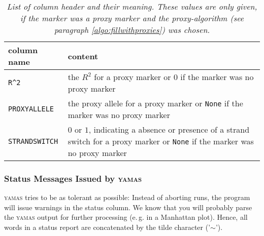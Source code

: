 \begin{table}[H]
 \caption{\emph{List of column header and their meaning. These values are only given, if the marker was a proxy marker and the proxy-algorithm (see paragraph \ref{algo:fillwithproxies}) was chosen.}}
 \centering
 \label{usage:table:proxymarker_entries}
\begin{tabular}{p{3cm}p{12cm}}
\rowcolor{light-gray}column name & content\\\hline
\verb+R^2+     & the $R^2$ for a proxy marker or $0$ if the marker was no proxy marker\\
\verb+PROXYALLELE+ & the proxy allele for a  proxy marker or \verb+None+ if the marker was no proxy marker\\
\verb+STRANDSWITCH+ & $0$ or $1$, indicating a absence or presence of a strand switch for a proxy marker or \verb+None+ if the marker was no proxy marker\\

\end{tabular}
\end{table}

\subsubsection{Status Messages Issued by \textsc{yamas}}
\label{usage:warnings}

\textsc{yamas} tries to be as tolerant as possible: Instead of aborting runs, the program will issue warnings in the status column. We know that you will probably parse the \textsc{yamas} output for further processing (e.\,g. in a Manhattan plot). Hence, all words in a status report are concatenated by the tilde character ('\texttt{$\sim$}').

